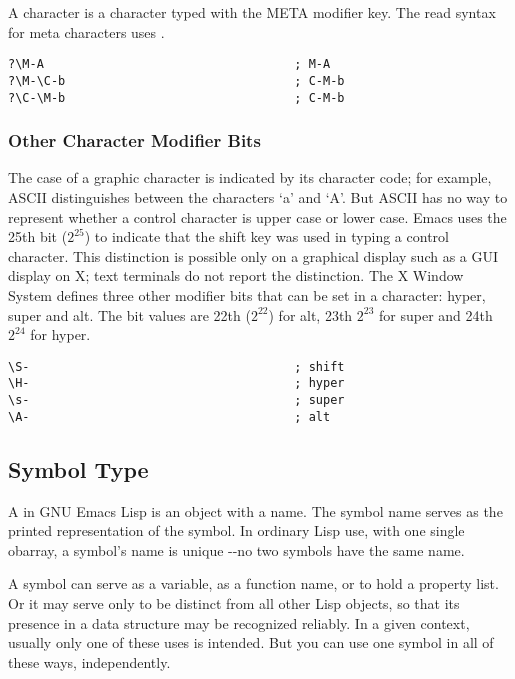 A  character is a character typed with the META modifier key.
The read syntax for meta characters uses .
\begin{lstlisting}
?\M-A                                   ; M-A
?\M-\C-b                                ; C-M-b
?\C-\M-b                                ; C-M-b

\end{lstlisting}


\subsubsection{Other Character Modifier Bits}
\label{sec:other-char-modif}

The case of a graphic character is indicated by its character code; for example, ASCII distinguishes between the characters ‘a’ and ‘A’.
But ASCII has no way to represent whether a control character is upper case or lower case.
Emacs uses the 25th bit (\(2^{25}\)) to indicate that the shift key was used in typing a control character.
This distinction is possible only on a graphical display such as a GUI display on X; text terminals do not report the distinction.
The X Window System defines three other modifier bits that can be set in a character: hyper, super and alt.
The bit values are 22th (\(2^{22}\)) for alt, 23th \(2^{23}\) for super and 24th \(2^{24}\) for hyper.

\begin{lstlisting}
\S-                                     ; shift
\H-                                     ; hyper
\s-                                     ; super
\A-                                     ; alt
\end{lstlisting}

\subsection{Symbol Type}
\label{sec:symbol-type}

A  in GNU Emacs Lisp is an object with a name.
The symbol name serves as the printed representation of the symbol.
In ordinary Lisp use, with one single obarray, a symbol’s name is unique -{}-no two symbols have the same name.


A symbol can serve as a variable, as a function name, or to hold a property list.
Or it may serve only to be distinct from all other Lisp objects, so that its presence in a data structure may be recognized reliably.
In a given context, usually only one of these uses is intended.
But you can use one symbol in all of these ways, independently.


